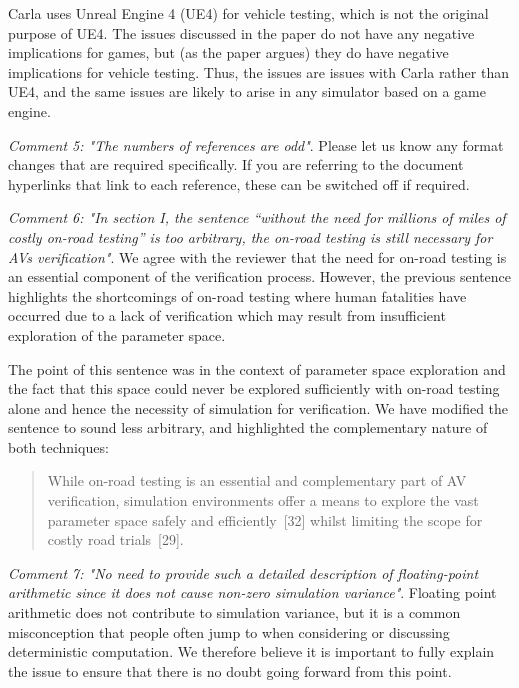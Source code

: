 \documentclass[11pt, a4paper]{letter} %
\begin{document}
\begin{letter}
Carla uses Unreal Engine 4 (UE4) for vehicle testing, which is not the original purpose of UE4. The issues discussed in the paper do not have any negative implications for games, but (as the paper argues) they do have negative implications for vehicle testing. Thus, the issues are issues with Carla rather than UE4, and the same issues are likely to arise in any simulator based on a game engine.


\bigskip


\textit{Comment 5: "The numbers of references are odd"}.
Please let us know any format changes that are required specifically. If you are referring to the document hyperlinks that link to each reference, these can be switched off if required.


\bigskip


\textit{Comment 6: "In section I, the sentence “without the need for millions of miles of costly on-road testing” is too arbitrary, the on-road testing is still necessary for AVs verification"}.
We agree with the reviewer that the need for on-road testing is an essential component of the verification process. However, the previous sentence highlights the shortcomings of on-road testing where human fatalities have occurred due to a lack of verification which may result from insufficient exploration of the parameter space.

The point of this sentence  was in the context of parameter space exploration and the fact that this space could never be explored sufficiently with on-road testing alone and hence the necessity of simulation for verification. We have modified the sentence to sound less arbitrary, and highlighted the complementary nature of both techniques:
\begin{quote}
While on-road testing is an essential and complementary part of AV verification, simulation environments offer a means to explore the vast parameter space safely and efficiently~[32] whilst limiting the scope for costly road trials~[29].
\end{quote}

\bigskip

\textit{Comment 7: "No need to provide such a detailed description of floating-point arithmetic since it does not cause non-zero simulation variance"}.
Floating point arithmetic does not contribute to simulation variance, but it is a common misconception that people often jump to when considering or discussing deterministic computation. We therefore believe it is important to fully explain the issue to ensure that there is no doubt going forward from this point.


\end{letter}
\end{document}
